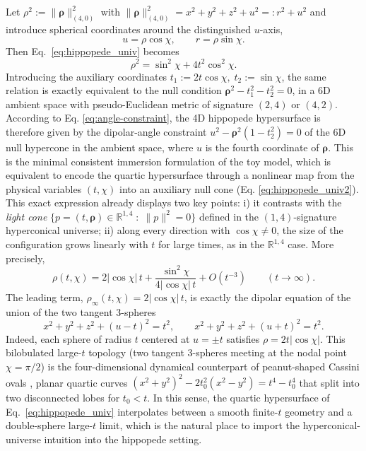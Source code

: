 \documentclass[3p,times,twocolumn]{elsarticle}
\renewcommand{\vec}[1]{\boldsymbol{#1}}
\begin{document}
 Let $\rho^2 := \|\vec \rho\|_{\scriptscriptstyle{(4,0)}}^2$ with $\|\vec \rho\|_{\scriptscriptstyle{(4,0)}}^2=x^2 + y^2+z^2 + u^2 =: r^2 + u^2$ and introduce spherical coordinates around the distinguished $u$-axis,
\begin{equation}\label{eq:angle-constraint}
u=\rho\cos\chi,\qquad r=\rho\sin\chi.
\end{equation}
Then Eq.~\eqref{eq:hippopede_univ} becomes
\begin{equation}
\label{eq:hippopede_univ2}
\rho^2=\sin^2\chi+4t^2\cos^2\chi.
\end{equation}
Introducing the auxiliary coordinates
$t_1:=2t\cos\chi,\; t_2:=\sin\chi$,
the same relation is exactly equivalent to the null condition $\vec{\rho}^2-t_1^2-t_2^2=0$,
in a 6D ambient space with pseudo-Euclidean metric of signature $(2,4)$ or $(4,2)$. According to Eq. \ref{eq:angle-constraint}, the 4D hippopede hypersurface is therefore given by the dipolar-angle constraint $u^2-{\vec \rho}^2(1-t_2^2) = 0$ of the 6D null hypercone in the ambient space, where $u$ is the fourth coordinate of $\vec \rho$. This is the minimal consistent immersion formulation of the toy model, which is equivalent to encode the quartic hypersurface through a nonlinear map from the physical variables $(t,\chi)$ into an auxiliary null cone (Eq. \ref{eq:hippopede_univ2}). This exact expression already displays two key points: i) it contrasts with the \textit{light cone} $\{p = (t,\vec{\rho}) \in \mathbb{R}^{1,4}\;:\; \|p\|^2 = 0\}$ defined in the $(1,4)$-signature hyperconical universe; ii) along every direction with $\cos\chi\neq0$, the size of the configuration grows linearly with $t$ for large times, as in the $\mathbb{R}^{1,4}$ case. More precisely,
\begin{equation}
\rho(t,\chi)=2|{\cos\chi}|\,t+\frac{\sin^2\chi}{4|{\cos\chi}|\,t}+O(t^{-3})\qquad (t\to\infty).
\end{equation}
The leading term, $\rho_{\infty}(t,\chi)=2|{\cos\chi}|\,t$, is exactly the dipolar equation of the union of the two tangent $3$-spheres
\begin{equation}
x^2+y^2+z^2+(u-t)^2=t^2,\qquad x^2+y^2+z^2+(u+t)^2=t^2.
\end{equation}
Indeed, each sphere of radius $t$ centered at $u=\pm t$ satisfies $\rho=2t|\cos\chi|$. This bilobulated large-$t$ topology (two tangent 3-spheres meeting at the nodal point $\chi=\pi/2$) is the four-dimensional dynamical counterpart of peanut-shaped Cassini ovals \cite{das2025peanut,lawrence1972catalogue}, planar quartic curves $(x^2+y^2)^2-2t_0^2(x^2-y^2)=t^4-t_0^4$ that split into two disconnected lobes for $t_0 < t$. In this sense, the quartic hypersurface of Eq.~\eqref{eq:hippopede_univ} interpolates between a smooth finite-$t$ geometry and a double-sphere large-$t$ limit, which is the natural place to import the hyperconical-universe intuition into the hippopede setting.
\end{document}
